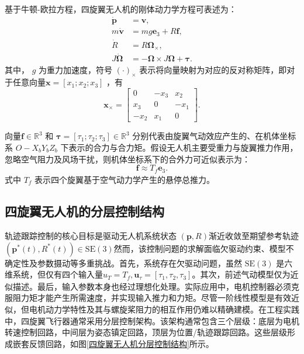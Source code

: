 基于牛顿-欧拉方程，四旋翼无人机的刚体动力学方程可表述为：
\begin{align}
	\dot{\mathbf{p}} &= \mathbf{v}, 
	\label{位置导数等于速度} \\
	m \dot{\mathbf{v}} &= m g \mathbf{e}_3 + {R} \mathbf{f}, 
	\label{平动动力学} \\
	\dot{R} &= {R} \boldsymbol{\Omega}_\times, 
	\label{姿态} \\
	{J} \dot{\boldsymbol{\Omega}} &= - \boldsymbol{\Omega} \times {J} \boldsymbol{\Omega} + \boldsymbol{\tau}.
	\label{旋转动力学}
\end{align}
其中， $ g $  为重力加速度，符号  $ (\cdot)_\times $  表示将向量映射为对应的反对称矩阵，即对于任意向量$\boldsymbol{x}=[x_1;x_2;x_3]$ ，有
\begin{equation}
\boldsymbol{x}_\times =
\begin{bmatrix}
	0 & -x_3 & x_2 \\
	x_3 & 0 & -x_1 \\
	-x_2 & x_1 & 0
\end{bmatrix}.
\end{equation}

向量$ \mathbf{f} \in \mathbb{R}^3 $  和  $ \boldsymbol{\tau} = [\tau_1; \tau_2; \tau_3] \in \mathbb{R}^3 $  分别代表由旋翼气动效应产生的、在机体坐标系  $ O - X_bY_bZ_b $  下表示的合力与合力矩。假设无人机主要受重力与旋翼推力作用，忽略空气阻力及风场干扰，则机体坐标系下的合外力可近似表示为：
\begin{equation}
	\mathbf{f} \approx \mathit{T_f} \mathbf{e}_3. \label{合外力}
\end{equation}
式中 $ \mathit{T_f} $ 表示四个旋翼基于空气动力学产生的悬停总推力。


\subsection{四旋翼无人机的分层控制结构}
轨迹跟踪控制的核心目标是驱动无人机系统状态 $(\mathbf{p}, R)$渐近收敛至期望参考轨迹$ (\mathbf{p}^{*}(t), R^{*}(t)) \in \mathrm{SE}(3) $然而，该控制问题的求解面临欠驱动约束、模型不确定性及参数摄动等多重挑战。首先，系统存在欠驱动问题，虽然 $ \mathrm{SE}(3) $ 是六维系统，但仅有四个输入量$  u_T = \mathit{T_f} , \mathbf{u}_\tau = [\tau_1, \tau_2, \tau_3]$。其次，前述气动模型仅为近似描述。最后，输入参数本身也经过理想化处理。实际应用中，电机控制器必须克服阻力矩才能产生所需速度，并实现输入推力和力矩。尽管一阶线性模型是有效近似，但电机动力学特性及其与螺旋桨阻力的相互作用仍难以精确建模。在工程实践中，四旋翼飞行器通常采用分层控制架构。该架构通常包含三个层级：底层为电机转速控制回路，中间层为姿态镇定回路，顶层为位置/轨迹跟踪回路。这些层级形成嵌套反馈回路，如图\ref{四旋翼无人机分层控制结构}所示。


